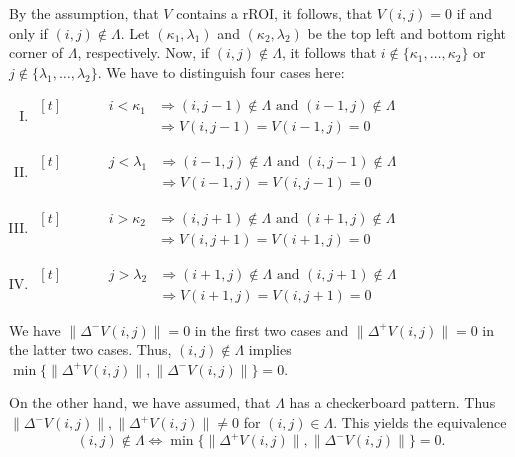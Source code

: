 \documentclass[a4paper,12pt]{article}
\newcommand{\norm}[1]{\lVert#1\rVert}
\theoremstyle{plain}
\theoremstyle{definition}
\begin{document}
By the assumption, that $V$ contains a rROI, it follows, that $V(i, j) = 0$ if and only if $(i, j) \notin \varLambda$. Let $(\kappa_1, \lambda_1)$ and $(\kappa_2, \lambda_2)$ be the top left and bottom right corner of $\varLambda$, respectively. Now, if $(i, j) \notin \varLambda$, it follows that $i \notin \{ \kappa_1, \dots, \kappa_2 \}$ or $j \notin \{ \lambda_1, \dots, \lambda_2 \}$. We have to distinguish four cases here:
\begin{enumerate}[(I)]
	\item $\begin{aligned}[t]
		\hspace{40pt} i < \kappa_1 &\Rightarrow (i, j - 1) \notin \varLambda \textrm{ and } (i - 1, j) \notin \varLambda \\
		&\Rightarrow V(i, j - 1) = V(i - 1, j) = 0
	\end{aligned}$
	\item $\begin{aligned}[t]
		\hspace{40pt} j < \lambda_1 &\Rightarrow (i - 1, j) \notin \varLambda \textrm{ and } (i, j - 1) \notin \varLambda \\
		&\Rightarrow V(i - 1, j) = V(i, j - 1) = 0
	\end{aligned}$
	\item $\begin{aligned}[t]
		\hspace{40pt} i > \kappa_2 &\Rightarrow (i, j + 1) \notin \varLambda \textrm{ and } (i + 1, j) \notin \varLambda \\
		&\Rightarrow V(i, j + 1) = V(i + 1, j) = 0
	\end{aligned}$
	\item $\begin{aligned}[t]
		\hspace{40pt} j > \lambda_2 &\Rightarrow (i + 1, j) \notin \varLambda \textrm{ and } (i, j + 1) \notin \varLambda \\
		&\Rightarrow V(i + 1, j) = V(i, j + 1) = 0
	\end{aligned}$
\end{enumerate}

We have $\norm{\Delta^- V(i, j)} = 0$ in the first two cases and $\norm{\Delta^+ V(i, j)} = 0$ in the latter two cases. Thus, $(i, j) \notin \varLambda$ implies $\min \{ \norm{\Delta^+ V(i, j)}, \norm{\Delta^- V(i, j)} \} = 0$.

On the other hand, we have assumed, that $\varLambda$ has a checkerboard pattern. Thus $\norm{\Delta^- V(i, j)}, \norm{\Delta^+ V(i, j)} \neq 0$ for $(i, j) \in \varLambda$. This yields the equivalence
\begin{equation*}
	(i, j) \notin \varLambda \Leftrightarrow \min \{ \norm{\Delta^+ V(i, j)}, \norm{\Delta^- V(i, j)} \} = 0.
\end{equation*}
\end{document}
